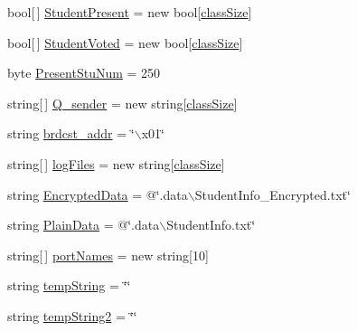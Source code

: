\begin{DoxyCompactItemize}
bool\mbox{[}$\,$\mbox{]} \hyperlink{class_sr_p___classroom_inq_1_1frm_classrrom_inq_aa5c7b55e4b30e09f574c44e90b06e7b2}{\-Student\-Present} = new bool\mbox{[}\hyperlink{class_sr_p___classroom_inq_1_1frm_classrrom_inq_a78d9aab335edfe53d39036b9d89928a8}{class\-Size}\mbox{]}
\item 
bool\mbox{[}$\,$\mbox{]} \hyperlink{class_sr_p___classroom_inq_1_1frm_classrrom_inq_a1a7e4f2ef2b99a4a641431918fedf7f5}{\-Student\-Voted} = new bool\mbox{[}\hyperlink{class_sr_p___classroom_inq_1_1frm_classrrom_inq_a78d9aab335edfe53d39036b9d89928a8}{class\-Size}\mbox{]}
\item 
byte \hyperlink{class_sr_p___classroom_inq_1_1frm_classrrom_inq_ad5da56ffdb5d79486d9cf4eb7c3f44d4}{\-Present\-Stu\-Num} = 250
\item 
string\mbox{[}$\,$\mbox{]} \hyperlink{class_sr_p___classroom_inq_1_1frm_classrrom_inq_afa4b6c4601d48db676d4013daef6624c}{\-Q\-\_\-sender} = new string\mbox{[}\hyperlink{class_sr_p___classroom_inq_1_1frm_classrrom_inq_a78d9aab335edfe53d39036b9d89928a8}{class\-Size}\mbox{]}
\item 
string \hyperlink{class_sr_p___classroom_inq_1_1frm_classrrom_inq_a1d96e40e37aca536a94b7107df4a2d71}{brdcst\-\_\-addr} = \char`\"{}$\backslash$x01\char`\"{}
\item 
string\mbox{[}$\,$\mbox{]} \hyperlink{class_sr_p___classroom_inq_1_1frm_classrrom_inq_a1b23b6935997df29f1b06ed831495076}{log\-Files} = new string\mbox{[}\hyperlink{class_sr_p___classroom_inq_1_1frm_classrrom_inq_a78d9aab335edfe53d39036b9d89928a8}{class\-Size}\mbox{]}
\item 
string \hyperlink{class_sr_p___classroom_inq_1_1frm_classrrom_inq_a3128c84ccd476a8a2e02bedab0ecc031}{\-Encrypted\-Data} = @\char`\"{}.data$\backslash$\-Student\-Info\-\_\-\-Encrypted.\-txt\char`\"{}
\item 
string \hyperlink{class_sr_p___classroom_inq_1_1frm_classrrom_inq_a511d08cf3bdc5282be448f0513bbd262}{\-Plain\-Data} = @\char`\"{}.data$\backslash$\-Student\-Info.\-txt\char`\"{}
\item 
string\mbox{[}$\,$\mbox{]} \hyperlink{class_sr_p___classroom_inq_1_1frm_classrrom_inq_a9c5b06a44069e68e732d7bcd7a8fa08c}{port\-Names} = new string\mbox{[}10\mbox{]}
\item 
string \hyperlink{class_sr_p___classroom_inq_1_1frm_classrrom_inq_aaad277eaea17731f132fb18aa3560a91}{temp\-String} = \char`\"{}\char`\"{}
\item 
string \hyperlink{class_sr_p___classroom_inq_1_1frm_classrrom_inq_a4ebaa0f6e4e9f61300c6aae855fc8fc1}{temp\-String2} = \char`\"{}\char`\"{}

\end{DoxyCompactItemize}
